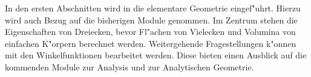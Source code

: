 

\Mtikzexternalize

\MSetSubject{\MINTMathematics}




\begin{MSectionStart}

\MModstartBox

In den ersten Abschnitten wird in die elementare Geometrie eingef"uhrt. 
Hierzu wird auch Bezug auf die bisherigen Module genommen. Im Zentrum stehen 
die Eigenschaften von Dreiecken, bevor Fl"achen von Vielecken und Volumina 
von einfachen K"orpern berechnet werden.
Weitergehende Fragestellungen k"onnen mit den Winkelfunktionen bearbeitet
werden. Diese bieten einen Ausblick auf die kommenden Module zur Analysis
und zur Analytischen Geometrie.
\end{MSectionStart}



